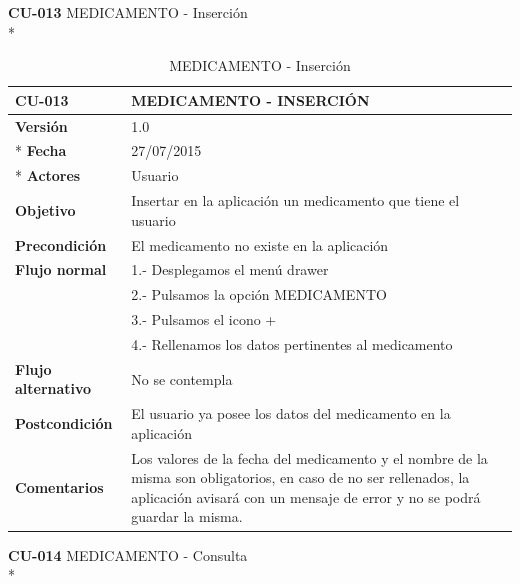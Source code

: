 \documentclass[../pfc.tex]{subfiles}
\begin{document}
		\textbf{CU-013}	MEDICAMENTO - Inserción\\*
		
		\begin{table}[H]
			\centering
			\begin{tabular}[t]{|p{3cm}|p{9.5cm}|}
				\hline \textbf{CU-013} & \textbf{MEDICAMENTO - INSERCIÓN} \\*
				\hline\hline \textbf{Versión} & 1.0 \\ *
				\hline\hline \textbf{Fecha} & 27/07/2015 \\ *
				\hline\textbf{Actores} 	& Usuario\\*
				\hline \textbf{Objetivo} & Insertar en la aplicación un medicamento que tiene el usuario\\* 			
				\hline \textbf{Precondición} & El medicamento no existe en la aplicación\\* 
				\hline \textbf{Flujo normal} & 1.- Desplegamos el menú drawer \\* 
				& 2.- Pulsamos la opción MEDICAMENTO\\*	
				& 3.- Pulsamos el icono + \\*	
				& 4.- Rellenamos los datos pertinentes al medicamento\\*	
				\hline \textbf{Flujo alternativo} & No se contempla \\* 
				\hline \textbf{Postcondición} & El usuario ya posee los datos del medicamento en la aplicación \\* 
				\hline \textbf{Comentarios}   & Los valores de la fecha del medicamento y el nombre de la misma son obligatorios, en caso de no ser rellenados, la aplicación avisará con un mensaje de error y no se podrá guardar la misma.\\*
				\hline
			\end{tabular}
			\caption{MEDICAMENTO - Inserción}
			\label{tabla:caso013}
		\end{table}
		
		
		
		
		\textbf{CU-014}	MEDICAMENTO - Consulta\\*
		
\end{document}
